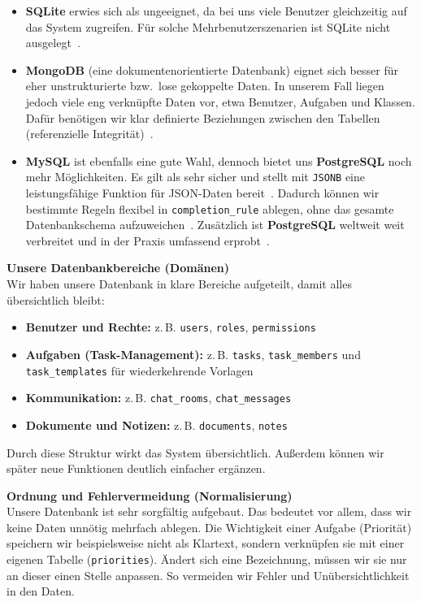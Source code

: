 \begin{itemize}
  \item \textbf{SQLite} erwies sich als ungeeignet, da bei uns viele Benutzer gleichzeitig
  auf das System zugreifen. Für solche Mehrbenutzerszenarien ist SQLite nicht ausgelegt~\cite{sqlite_whentouse}.

  \item \textbf{MongoDB} (eine dokumentenorientierte Datenbank) eignet sich besser für eher
  unstrukturierte bzw.\ lose gekoppelte Daten. In unserem Fall liegen jedoch viele eng
  verknüpfte Daten vor, etwa Benutzer, Aufgaben und Klassen. Dafür benötigen wir klar
  definierte Beziehungen zwischen den Tabellen (referenzielle Integrität)~\cite{fowler2012nosql}.

  \item \textbf{MySQL} ist ebenfalls eine gute Wahl, dennoch bietet uns \textbf{PostgreSQL}
  noch mehr Möglichkeiten. Es gilt als sehr sicher und stellt mit \texttt{JSONB} eine
  leistungsfähige Funktion für JSON-Daten bereit~\cite{postgresql_jsonb}. Dadurch können wir bestimmte
  Regeln flexibel in \texttt{completion\_rule} ablegen, ohne das gesamte Datenbankschema
  aufzuweichen~\cite{postgresql_jsonb}. Zusätzlich ist \textbf{PostgreSQL} weltweit weit verbreitet und
  in der Praxis umfassend erprobt~\cite{dbengines2026ranking}.
\end{itemize}

\vspace{0.5cm}
\noindent\textbf{Unsere Datenbankbereiche (Domänen)} \\
Wir haben unsere Datenbank in klare Bereiche aufgeteilt, damit alles übersichtlich bleibt:
\begin{itemize}
    \item \textbf{Benutzer und Rechte:} z.\,B. \texttt{users}, \texttt{roles}, \texttt{permissions}
    \item \textbf{Aufgaben (Task-Management):} z.\,B. \texttt{tasks}, \texttt{task\_members} und \texttt{task\_templates} für wiederkehrende Vorlagen
    \item \textbf{Kommunikation:} z.\,B. \texttt{chat\_rooms}, \texttt{chat\_messages}
    \item \textbf{Dokumente und Notizen:} z.\,B. \texttt{documents}, \texttt{notes}
\end{itemize}
Durch diese Struktur wirkt das System übersichtlich. Außerdem können wir später neue Funktionen deutlich einfacher ergänzen.

\vspace{0.5cm}
\noindent\textbf{Ordnung und Fehlervermeidung (Normalisierung)} \\
Unsere Datenbank ist sehr sorgfältig aufgebaut\cite{elmasri2015fundamentals}. Das bedeutet vor allem, dass wir keine Daten unnötig mehrfach ablegen. Die Wichtigkeit einer Aufgabe (Priorität) speichern wir beispielsweise nicht als Klartext, sondern verknüpfen sie mit einer eigenen Tabelle (\texttt{priorities}). Ändert sich eine Bezeichnung, müssen wir sie nur an dieser einen Stelle anpassen. So vermeiden wir Fehler und Unübersichtlichkeit in den Daten.

